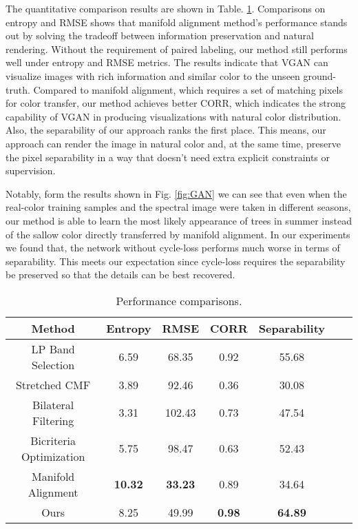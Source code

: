 \documentclass[10pt,conference,a4paper]{IEEEtran}
\begin{document}
The quantitative comparison results are shown in Table. \ref{table:performance}.
Comparisons on entropy and RMSE shows that manifold alignment method's performance stands out by solving the tradeoff between information preservation and natural rendering.
Without the requirement of paired labeling, our method still performs well under entropy and RMSE metrics. The results indicate that VGAN can visualize images with rich information and similar color to the unseen ground-truth.
Compared to manifold alignment, which requires a set of matching pixels for color transfer, our method achieves better CORR, which indicates the strong capability of VGAN in producing visualizations with natural color distribution. Also, the separability of our approach ranks the first place.
This means, our approach can render the image in natural color and, at the same time, preserve the pixel separability in a way that doesn't need extra explicit constraints or supervision.

Notably, form the results shown in Fig. \ref{fig:GAN} we can see that even when the real-color training samples and the spectral image were taken in different seasons, our method is able to learn the most likely appearance of trees in summer instead of the sallow color directly transferred by manifold alignment.
In our experiments we found that, the network without cycle-loss performs much worse in terms of separability. This meets our expectation since cycle-loss requires the separability be preserved so that the details can be best recovered.

\begin{table}[t]
\centering
 \caption{Performance comparisons.}
  \label{table:performance}
  \begin{tabular}{ccccccc}
    \hline
    Method                   & Entropy        & RMSE           & CORR          & Separability           \\
    \hline
    LP Band Selection        & 6.59           & 68.35          & 0.92          & 55.68                  \\
    \hline
    Stretched CMF            & 3.89           & 92.46          & 0.36          & 30.08                  \\
    \hline
    Bilateral Filtering      & 3.31           & 102.43         & 0.73          & 47.54                  \\
    \hline
    Bicriteria Optimization  & 5.75           & 98.47          & 0.63          & 52.43                  \\
    \hline
    Manifold Alignment       & \textbf{10.32} & \textbf{33.23} & 0.89          & 34.64                  \\
    \hline
    Ours                     & 8.25           & 49.99          & \textbf{0.98} & \textbf{64.89}         \\
    \hline
  \end{tabular}
\end{table}
\end{document}
